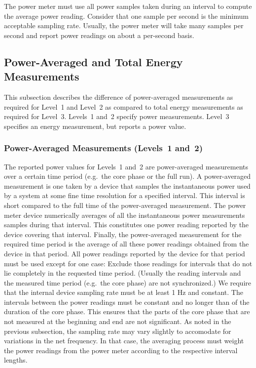 The power meter must use all power samples taken during an interval to compute the average power reading.
Consider that one sample per second is the minimum acceptable sampling rate.
Usually, the power meter will take many samples per second and report power readings on about a per-second basis.

\subsection{Power-Averaged and Total Energy Measurements}
\label{sec:PAaTEM}

This subsection describes the difference of power-averaged measurements as required for Level~1 and Level~2 as compared to total energy measurements as required for Level~3.
Levels~1 and~2 specify power measurements.
Level~3 specifies an energy measurement, but reports a power value.

\subsubsection{Power-Averaged Measurements (Levels~1 and~2)}

The reported power values for Levels~1 and~2 are power-averaged measurements over a certain time period (e.g.~the core phase or the full run).
A power-averaged measurement is one taken by a device that samples the instantaneous power used by a system at some fine time resolution for a specified interval.
This interval is short compared to the full time of the power-averaged measurement.
The power meter device numerically averages of all the instantaneous power measurements samples during that interval.
This constitutes one power reading reported by the device covering that interval.
Finally, the power-averaged measurement for the required time period is the average of all these power readings obtained from the device in that period.
All power readings reported by the device for that period must be used except for one case:
Exclude those readings for intervals that do not lie completely in the requested time period.
(Usually the reading intervals and the measured time period (e.g.~the core phase) are not synchronized.)
We require that the internal device sampling rate must be at least 1 Hz and constant.
The intervals between the power readings must be constant and no longer than \MaxReadingIntervalCorePhaseLTwoThree{} of the duration of the core phase.
This ensures that the parts of the core phase that are not measured at the beginning and end are not significant.
As noted in the previous subsection, the sampling rate may vary slightly to accomodate for variations in the net frequency.
In that case, the averaging process must weight the power readings from the power meter according to the respective interval lengths.

